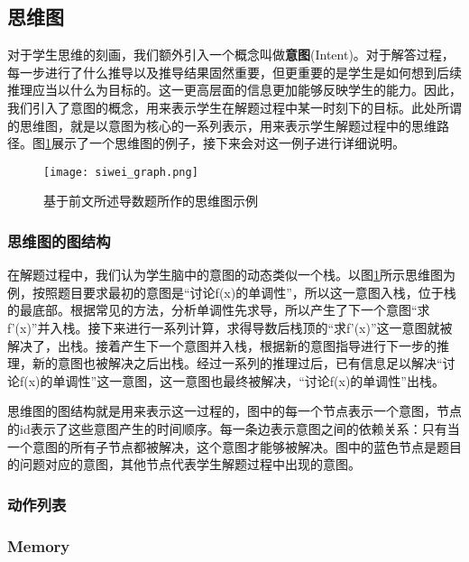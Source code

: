 \subsection{思维图}

对于学生思维的刻画，我们额外引入一个概念叫做\textbf{意图}(Intent)。对于解答过程，每一步进行了什么推导以及推导结果固然重要，但更重要的是学生是如何想到后续推理应当以什么为目标的。这一更高层面的信息更加能够反映学生的能力。因此，我们引入了意图的概念，用来表示学生在解题过程中某一时刻下的目标。此处所谓的思维图，就是以意图为核心的一系列表示，用来表示学生解题过程中的思维路径。图\ref{fig:siwei_graph}展示了一个思维图的例子，接下来会对这一例子进行详细说明。

\begin{figure}
    \centering
    \texttt{[image: siwei\_graph.png]}
    \caption{基于前文所述导数题所作的思维图示例}
    \label{fig:siwei_graph}
\end{figure}

\subsubsection*{思维图的图结构}

在解题过程中，我们认为学生脑中的意图的动态类似一个栈。以图\ref{fig:siwei_graph}所示思维图为例，按照题目要求最初的意图是“讨论f(x)的单调性”，所以这一意图入栈，位于栈的最底部。根据常见的方法，分析单调性先求导，所以产生了下一个意图“求f'(x)”并入栈。接下来进行一系列计算，求得导数后栈顶的“求f'(x)”这一意图就被解决了，出栈。接着产生下一个意图并入栈，根据新的意图指导进行下一步的推理，新的意图也被解决之后出栈。经过一系列的推理过后，已有信息足以解决“讨论f(x)的单调性”这一意图，这一意图也最终被解决，“讨论f(x)的单调性”出栈。

思维图的图结构就是用来表示这一过程的，图中的每一个节点表示一个意图，节点的id表示了这些意图产生的时间顺序。每一条边表示意图之间的依赖关系：只有当一个意图的所有子节点都被解决，这个意图才能够被解决。图中的蓝色节点是题目的问题对应的意图，其他节点代表学生解题过程中出现的意图。

\subsubsection*{动作列表}

\subsubsection*{Memory}